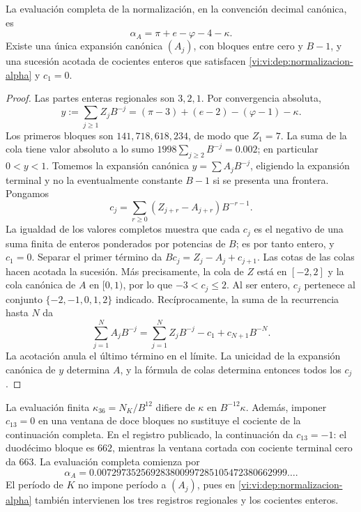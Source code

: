 \begin{theorem}
\label{vi:vi:dep:alpha-completa}
La evaluación completa de la normalización, en la convención decimal
canónica, es
\begin{equation}
 \alpha_A=\pi+e-\varphi-4-\kappa.
 \label{vi:vi:dep:alpha-A}
\end{equation}
Existe una única expansión canónica \((A_j)\), con bloques entre cero
y \(B-1\), y una sucesión acotada de cocientes enteros que satisfacen
\eqref{vi:vi:dep:normalizacion-alpha} y \(c_1=0\).
\end{theorem}
\begin{proof}
Las partes enteras regionales son \(3,2,1\). Por convergencia absoluta,
\[
 y:=\sum_{j\ge1}Z_jB^{-j}
   =(\pi-3)+(e-2)-(\varphi-1)-\kappa.
\]
Los primeros bloques son \(141,718,618,234\), de modo que
\(Z_1=7\). La suma de la cola tiene valor absoluto a lo sumo
\(1998\sum_{j\ge2}B^{-j}=0.002\); en particular \(0<y<1\).
Tomemos la expansión canónica \(y=\sum A_jB^{-j}\), eligiendo la
expansión terminal y no la eventualmente constante \(B-1\) si se
presenta una frontera. Pongamos
\[
 c_j=\sum_{r\ge0}(Z_{j+r}-A_{j+r})B^{-r-1}.
\]
La igualdad de los valores completos muestra que cada \(c_j\) es el
negativo de una suma finita de enteros ponderados por potencias de
\(B\); es por tanto entero, y \(c_1=0\). Separar el primer término
da \(Bc_j=Z_j-A_j+c_{j+1}\). Las cotas de las colas hacen acotada
la sucesión. Más precisamente, la cola de \(Z\) está en \([-2,2]\)
y la cola canónica de \(A\) en \([0,1)\), por lo que
\(-3<c_j\le2\). Al ser entero, \(c_j\) pertenece al conjunto
\(\{-2,-1,0,1,2\}\) indicado.
Recíprocamente, la suma de la recurrencia hasta \(N\) da
\[
 \sum_{j=1}^N A_jB^{-j}
 =\sum_{j=1}^N Z_jB^{-j}-c_1+c_{N+1}B^{-N}.
\]
La acotación anula el último término en el límite. La unicidad de la
expansión canónica de \(y\) determina \(A\), y la fórmula de colas
determina entonces todos los \(c_j\).
\end{proof}

La evaluación finita \(\kappa_{36}=N_K/B^{12}\) difiere de
\(\kappa\) en \(B^{-12}\kappa\). Además, imponer
\(c_{13}=0\) en una ventana de doce bloques no sustituye el cociente
de la continuación completa. En el registro publicado, la continuación
da \(c_{13}=-1\): el duodécimo bloque es \(662\), mientras la
ventana cortada con cociente terminal cero da \(663\). La evaluación
completa comienza por
\[
 \alpha_A=0.007297352569283800997285105472380662999\ldots.
\]
El período de \(K\) no impone período a \((A_j)\), pues en
\eqref{vi:vi:dep:normalizacion-alpha} también intervienen los tres
registros regionales y los cocientes enteros.

